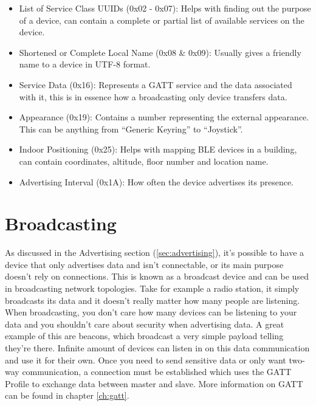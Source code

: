 \documentclass[pdftex,a4paper,12pt,twoside]{report}
\begin{document}
\begin{itemize}
	\item {List of Service Class UUIDs (0x02 - 0x07): Helps with finding out the purpose of a device, can contain a complete or partial list of available services on the device.}
	\item {Shortened or Complete Local Name (0x08 \& 0x09): Usually gives a friendly name to a device in UTF-8 format.}
	\item {Service Data (0x16): Represents a GATT service and the data associated with it, this is in essence how a broadcasting only device transfers data.}
	\item {Appearance (0x19): Contains a number representing the external appearance. This can be anything from ``Generic Keyring'' to ``Joystick''.}
	\item {Indoor Positioning (0x25): Helps with mapping BLE devices in a building, can contain coordinates, altitude, floor number and location name.}
	\item {Advertising Interval (0x1A): How often the device advertises its presence.}
\end{itemize}

\section{Broadcasting}
\label{sec:broadcasting}
As discussed in the Advertising section (\ref{sec:advertising}), it's possible to have a device that only advertises data and isn't connectable, or its main purpose doesn't rely on connections. This is known as a broadcast device and can be used in broadcasting network topologies. Take for example a radio station, it simply broadcasts its data and it doesn't really matter how many people are listening. When broadcasting, you don't care how many devices can be listening to your data and you shouldn't care about security when advertising data. A great example of this are beacons, which broadcast a very simple payload telling they're there. Infinite amount of devices can listen in on this data communication and use it for their own. Once you need to send sensitive data or only want two-way communication, a connection must be established which uses the GATT Profile to exchange data between master and slave. More information on GATT can be found in chapter \ref{ch:gatt}.
\end{document}
